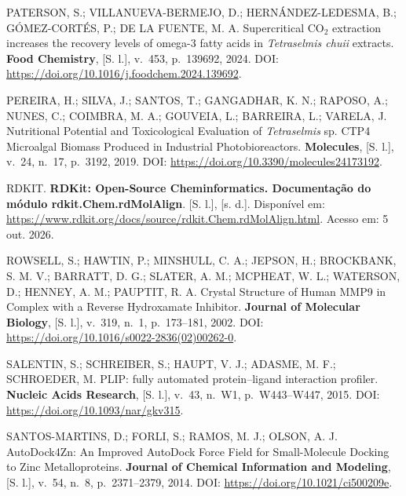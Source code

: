 \begin{samepage}
\filbreak\hypertarget{cite.0@paterson2024}{}PATERSON, S.; VILLANUEVA-BERMEJO, D.; HERNÁNDEZ-LEDESMA, B.; GÓMEZ-CORTÉS, P.; DE LA FUENTE, M. A. Supercritical CO$_2$ extraction increases the recovery levels of omega-3 fatty acids in \textit{Tetraselmis chuii} extracts. \textbf{Food Chemistry}, [S. l.], v.~453, p.~139692, 2024. DOI: \url{https://doi.org/10.1016/j.foodchem.2024.139692}.
\end{samepage}

\begin{samepage}
\filbreak\hypertarget{cite.0@pereira2019}{}PEREIRA, H.; SILVA, J.; SANTOS, T.; GANGADHAR, K. N.; RAPOSO, A.; NUNES, C.; COIMBRA, M. A.; GOUVEIA, L.; BARREIRA, L.; VARELA, J. Nutritional Potential and Toxicological Evaluation of \textit{Tetraselmis} sp. CTP4 Microalgal Biomass Produced in Industrial Photobioreactors. \textbf{Molecules}, [S. l.], v.~24, n.~17, p.~3192, 2019. DOI: \url{https://doi.org/10.3390/molecules24173192}.
\end{samepage}

\begin{samepage}
\filbreak\hypertarget{cite.0@rdkit}{}RDKIT. \textbf{RDKit: Open-Source Cheminformatics. Documentação do módulo rdkit.Chem.rdMolAlign}. [S. l.], [s. d.]. Disponível em: \url{https://www.rdkit.org/docs/source/rdkit.Chem.rdMolAlign.html}. Acesso em: 5 out. 2026.
\end{samepage}

\begin{samepage}
\filbreak\hypertarget{cite.0@rowsell2002}{}ROWSELL, S.; HAWTIN, P.; MINSHULL, C. A.; JEPSON, H.; BROCKBANK, S. M. V.; BARRATT, D. G.; SLATER, A. M.; MCPHEAT, W. L.; WATERSON, D.; HENNEY, A. M.; PAUPTIT, R. A. Crystal Structure of Human MMP9 in Complex with a Reverse Hydroxamate Inhibitor. \textbf{Journal of Molecular Biology}, [S. l.], v.~319, n.~1, p.~173--181, 2002. DOI: \url{https://doi.org/10.1016/s0022-2836(02)00262-0}.
\end{samepage}

\begin{samepage}
\filbreak\hypertarget{cite.0@salentin2015plip}{}SALENTIN, S.; SCHREIBER, S.; HAUPT, V. J.; ADASME, M. F.; SCHROEDER, M. PLIP: fully automated protein--ligand interaction profiler. \textbf{Nucleic Acids Research}, [S. l.], v.~43, n.~W1, p.~W443--W447, 2015. DOI: \url{https://doi.org/10.1093/nar/gkv315}.
\end{samepage}

\begin{samepage}
\filbreak\hypertarget{cite.0@santos2014zn}{}SANTOS-MARTINS, D.; FORLI, S.; RAMOS, M. J.; OLSON, A. J. AutoDock4Zn: An Improved AutoDock Force Field for Small-Molecule Docking to Zinc Metalloproteins. \textbf{Journal of Chemical Information and Modeling}, [S. l.], v.~54, n.~8, p.~2371--2379, 2014. DOI: \url{https://doi.org/10.1021/ci500209e}.
\end{samepage}

